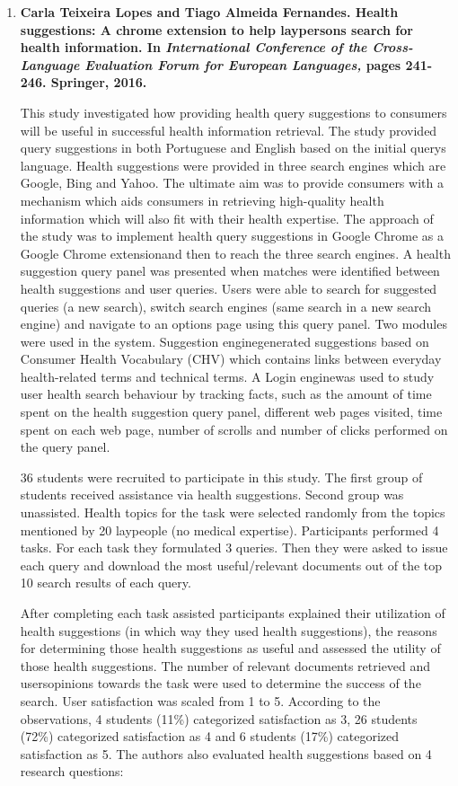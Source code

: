 \documentclass[]{article}
\begin{document}
\begin{enumerate}
\item {\textbf{Carla Teixeira Lopes and Tiago Almeida Fernandes. Health suggestions: A chrome extension to help laypersons search for health information. In \textit{International Conference of the Cross-Language Evaluation Forum for European Languages,} pages 241-246. Springer, 2016.}}

This study investigated how providing health query suggestions to consumers will be useful in successful health information retrieval. The study provided query suggestions in both Portuguese and English based on the initial query\textquotesingle s language. Health suggestions were provided in three search engines which are Google, Bing and Yahoo. The ultimate aim was to provide consumers with a mechanism which aids consumers in retrieving high-quality health information which will also fit with their health expertise. The approach of the study was to implement health query suggestions in Google Chrome as a \textquotesingle Google Chrome extension\textquotesingle and then to reach the three search engines. A health suggestion query panel was presented when matches were identified between health suggestions and user queries. Users were able to search for suggested queries (a new search), switch search engines (same search in a new search engine) and navigate to an options page using this query panel. Two modules were used in the system. \textquotesingle Suggestion engine\textquotesingle generated suggestions based on Consumer Health Vocabulary (CHV) which contains links between everyday health-related terms and technical terms. A \textquotesingle Login engine\textquotesingle was used to study user health search behaviour by tracking facts, such as the amount of time spent on the health suggestion query panel, different web pages visited, time spent on each web page, number of scrolls and number of clicks performed on the query panel. 

36 students were recruited to participate in this study. The first group of students received assistance via health suggestions. Second group was unassisted. Health topics for the task were selected randomly from the topics mentioned by 20 laypeople (no medical expertise). Participants performed 4 tasks. For each task they formulated 3 queries. Then they were asked to issue each query and download the most useful/relevant documents out of the top 10 search results of each query. 

After completing each task assisted participants explained their utilization of health suggestions (in which way they used health suggestions), the reasons for determining those health suggestions as useful  and assessed the utility of those health suggestions. The number of relevant documents retrieved and users\textquotesingle opinions towards the task were used to determine the success of the search. User satisfaction was scaled from 1 to 5. According to the observations, 4 students (11\%) categorized satisfaction as 3, 26 students (72\%) categorized satisfaction as 4 and 6 students (17\%) categorized satisfaction as 5. The authors also evaluated health suggestions based on 4 research questions:


\end{enumerate}
\end{document}
